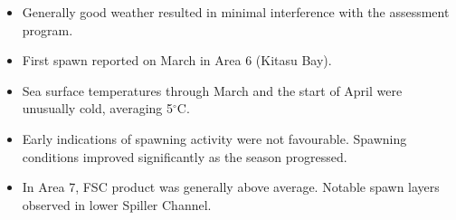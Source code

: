 \begin{itemize}

\item Generally good weather resulted in minimal interference with the
assessment program.

\item First spawn reported on March  in Area 6 (Kitasu Bay).

\item Sea surface temperatures through March and the start of
April were unusually cold, averaging 5$^\circ\text{C}$.

\item Early indications of spawning activity were not favourable.
Spawning conditions improved significantly as the season progressed.

\item In Area 7, FSC product was generally above average.
Notable spawn layers observed in lower Spiller Channel.

\end{itemize}